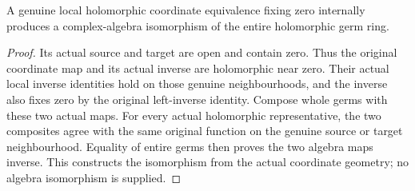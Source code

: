\begin{lemma}
\label{hir:actual-nonlinear-local-germ-algebra-isomorphism}
\leanok
{}
A genuine local holomorphic coordinate equivalence fixing zero internally
produces a complex-algebra isomorphism of the entire holomorphic germ ring.
\end{lemma}
\begin{proof}
Its actual source and target are open and contain zero. Thus the original
coordinate map and its actual inverse are holomorphic near zero. Their
actual local inverse identities hold on those genuine neighbourhoods, and
the inverse also fixes zero by the original left-inverse identity. Compose
whole germs with these two actual maps. For every actual holomorphic
representative, the two composites agree with the same original function
on the genuine source or target neighbourhood. Equality of entire germs
then proves the two algebra maps inverse. This constructs the isomorphism
from the actual coordinate geometry; no algebra isomorphism is supplied.
\end{proof}

